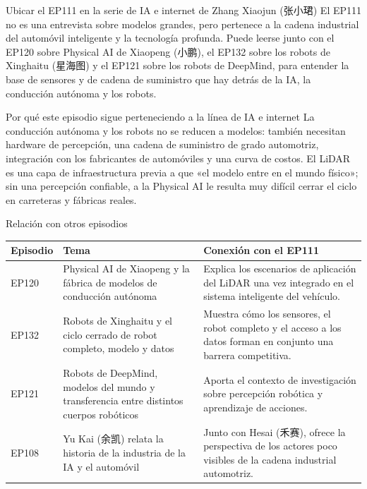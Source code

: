 \documentclass[a4paper]{article}
\begin{document}
\begin{importantbox}{Ubicar el EP111 en la serie de IA e internet de Zhang Xiaojun (张小珺)}
El EP111 no es una entrevista sobre modelos grandes, pero pertenece a la cadena industrial del automóvil inteligente y la tecnología profunda. Puede leerse junto con el EP120 sobre Physical AI de Xiaopeng (小鹏), el EP132 sobre los robots de Xinghaitu (星海图) y el EP121 sobre los robots de DeepMind, para entender la base de sensores y de cadena de suministro que hay detrás de la IA, la conducción autónoma y los robots.
\end{importantbox}

\begin{knowledgebox}{Por qué este episodio sigue perteneciendo a la línea de IA e internet}
La conducción autónoma y los robots no se reducen a modelos: también necesitan hardware de percepción, una cadena de suministro de grado automotriz, integración con los fabricantes de automóviles y una curva de costos. El LiDAR es una capa de infraestructura previa a que «el modelo entre en el mundo físico»; sin una percepción confiable, a la Physical AI le resulta muy difícil cerrar el ciclo en carreteras y fábricas reales.
\end{knowledgebox}

\begin{knowledgebox}{Relación con otros episodios}
\begin{tabularx}{\textwidth}{p{}p{}X}
\toprule
Episodio & Tema & Conexión con el EP111 \\
\midrule
EP120 & Physical AI de Xiaopeng y la fábrica de modelos de conducción autónoma & Explica los escenarios de aplicación del LiDAR una vez integrado en el sistema inteligente del vehículo. \\
EP132 & Robots de Xinghaitu y el ciclo cerrado de robot completo, modelo y datos & Muestra cómo los sensores, el robot completo y el acceso a los datos forman en conjunto una barrera competitiva. \\
EP121 & Robots de DeepMind, modelos del mundo y transferencia entre distintos cuerpos robóticos & Aporta el contexto de investigación sobre percepción robótica y aprendizaje de acciones. \\
EP108 & Yu Kai (余凯) relata la historia de la industria de la IA y el automóvil & Junto con Hesai (禾赛), ofrece la perspectiva de los actores poco visibles de la cadena industrial automotriz. \\
\bottomrule
\end{tabularx}
\end{knowledgebox}
\end{document}
